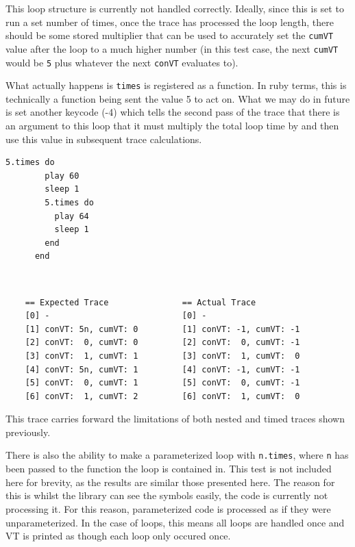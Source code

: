 \documentclass[11pt, abstracton, twoside, titlepage=true]{scrartcl}
\begin{document}
This loop structure is currently not handled correctly. Ideally, since this is set 
to run a set number of times, once the trace has processed the loop length, there 
should be some stored multiplier that can be used to accurately set the 
\texttt{cumVT} value after the loop to a much higher number (in this test case, the 
next \texttt{cumVT} would be \texttt{5} plus whatever the next \texttt{conVT} 
evaluates to).

What actually happens is \texttt{times} is registered as a function. In ruby terms,
this is technically a function being sent the value 5 to act on. What we may do in 
future is set another keycode (-4) which tells the second pass of the trace that 
there is an argument to this loop that it must multiply the total loop time by and
then use this value in subsequent trace calculations.

\begin{minipage}{\textwidth}
	\begin{lstlisting}[style = sonicpi]
      5.times do
        play 60
        sleep 1
        5.times do
          play 64
          sleep 1
        end
      end
	\end{lstlisting}
\end{minipage}
\\
\begin{lstlisting}
    == Expected Trace               == Actual Trace
    [0] -                           [0] -
    [1] conVT: 5n, cumVT: 0         [1] conVT: -1, cumVT: -1
    [2] conVT:  0, cumVT: 0         [2] conVT:  0, cumVT: -1
    [3] conVT:  1, cumVT: 1         [3] conVT:  1, cumVT:  0
    [4] conVT: 5n, cumVT: 1         [4] conVT: -1, cumVT: -1
    [5] conVT:  0, cumVT: 1         [5] conVT:  0, cumVT: -1
    [6] conVT:  1, cumVT: 2         [6] conVT:  1, cumVT:  0
\end{lstlisting}

This trace carries forward the limitations of both nested and timed traces shown 
previously.

There is also the ability to make a parameterized loop with \texttt{n.times},
where \texttt{n} has been passed to the function the loop is contained in. This
test is not included here for brevity, as the results are similar those presented
here. The reason for this is whilst the library can see the symbols easily,
the code is currently not processing it. For this reason, parameterized code
is processed as if they were unparameterized. In the case of loops, this means
all loops are handled once and VT is printed as though each loop only occured once.
\end{document}
